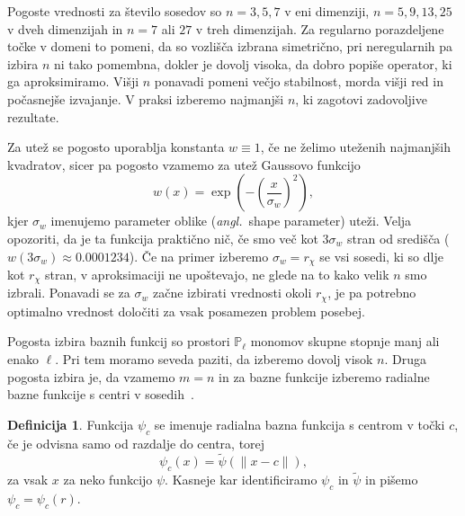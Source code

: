 \documentclass[12pt,a4paper,twoside]{article}
\theoremstyle{definition} %
\newtheorem{definicija}{Definicija}[section]
\theoremstyle{plain} %
\numberwithin{equation}{section}
\newcommand{\ang}[1]{(\hspace{-1.5px}\textit{angl.}\ #1)}
\begin{document}
Pogoste vrednosti za število sosedov so $n = 3, 5, 7$ v eni dimenziji, $n = 5, 9, 13, 25$ v dveh
dimenzijah in $n = 7$ ali $27$ v treh dimenzijah. Za regularno porazdeljene točke v domeni to
pomeni, da so vozlišča izbrana simetrično, pri neregularnih pa izbira $n$ ni tako pomembna, dokler
je dovolj visoka, da dobro popiše operator, ki ga aproksimiramo. Višji $n$ ponavadi pomeni večjo
stabilnost, morda višji red in počasnejše izvajanje. V praksi izberemo najmanjši $n$, ki zagotovi
zadovoljive rezultate.

Za utež se pogosto uporablja konstanta $w\equiv1$, če ne želimo uteženih
najmanjših kvadratov, sicer pa pogosto vzamemo za utež Gaussovo funkcijo
\begin{equation}
   w(x) = \exp\left(-\left(\frac{x}{\sigma_w}\right)^2 \right),
\end{equation}
kjer $\sigma_w$ imenujemo parameter oblike \ang{shape parameter} uteži.
Velja opozoriti, da je ta funkcija praktično nič, če smo več kot $3\sigma_w$
stran od središča ($w(3\sigma_w) \approx 0.0001234$). Če na primer izberemo
$\sigma_w = r_\chi$ se vsi sosedi, ki so dlje kot $r_\chi$ stran, v
aproksimaciji ne upoštevajo, ne glede na to kako velik $n$ smo izbrali.
Ponavadi se za $\sigma_w$ začne izbirati vrednosti okoli $r_\chi$, je
pa potrebno optimalno vrednost določiti za vsak posamezen problem posebej.

Pogosta izbira baznih funkcij so prostori $\mathbb{P}_\ell$ monomov skupne
stopnje manj ali enako $\ell$. Pri tem moramo seveda paziti, da izberemo dovolj
visok $n$. Druga pogosta izbira je, da vzamemo $m = n$ in za bazne funkcije
izberemo radialne bazne funkcije s centri v sosedih~\cite{kosec2011h}.

\begin{definicija}
  Funkcija $\psi_c$ se imenuje radialna bazna funkcija s centrom v točki $c$, če je odvisna samo od
  razdalje do centra, torej
  \begin{equation}
    \psi_c(x) = \tilde\psi(\|x - c\|),
  \end{equation}
  za vsak $x$ za neko funkcijo $\psi$. Kasneje kar identificiramo $\psi_c$
  in $\tilde\psi$ in pišemo $\psi_c = \psi_c(r)$.
\end{definicija}
\end{document}
